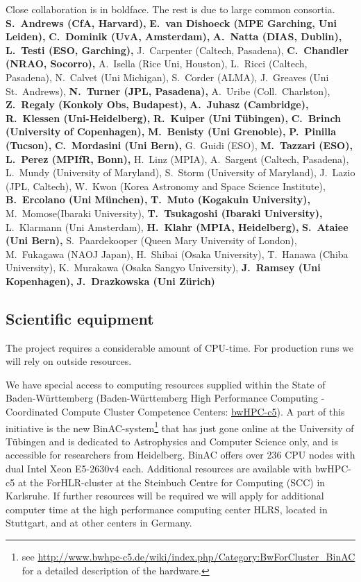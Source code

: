 \documentclass[10pt,fleqn,twoside]{article}
\begin{document}
{\small
Close collaboration is in boldface. The rest is due to large common consortia.\\
{\bf S.~Andrews (CfA, Harvard),}
{\bf E.~van Dishoeck (MPE Garching, Uni Leiden),}
{\bf C.~Dominik (UvA, Amsterdam),}
{\bf A.~Natta (DIAS, Dublin),}
{\bf L.~Testi (ESO, Garching),}
J.~Carpenter (Caltech, Pasadena),
{\bf C.~Chandler (NRAO, Socorro),}
A.~Isella (Rice Uni, Houston),
L.~Ricci (Caltech, Pasadena),
N.~Calvet (Uni Michigan),
S.~Corder (ALMA),
J.~Greaves (Uni St.~Andrews),
{\bf N.~Turner (JPL, Pasadena),}
A.~Uribe (Coll.~Charlston),
{\bf Z.~Regaly (Konkoly Obs, Budapest),}
{\bf A.~Juhasz (Cambridge),}
{\bf R.~Klessen (Uni-Heidelberg),}
{\bf R.~Kuiper (Uni T\"ubingen),}
{\bf C.~Brinch (University of Copenhagen),}
{\bf M.~Benisty (Uni Grenoble),}
{\bf P.~Pinilla (Tucson),}
{\bf C.~Mordasini (Uni Bern),}
G.~Guidi (ESO),
{\bf M.~Tazzari (ESO),}
{\bf L.~Perez (MPIfR, Bonn),}
H.~Linz (MPIA),
A.~Sargent (Caltech, Pasadena),
L.~Mundy (University of Maryland),
S.~Storm (University of Maryland),
J.~Lazio (JPL, Caltech),
W.~Kwon (Korea Astronomy and Space Science Institute),
{\bf B.~Ercolano (Uni M\"unchen),}
{\bf T.~Muto (Kogakuin University),}
M.~Momose(Ibaraki University),
{\bf T.~Tsukagoshi (Ibaraki University),}
L.~Klarmann (Uni Amsterdam),
{\bf H.~Klahr (MPIA, Heidelberg),}
{\bf S.~Ataiee (Uni Bern),}
S.~Paardekooper (Queen Mary University of London),
M.~Fukagawa (NAOJ Japan),
H.~Shibai (Osaka University),
T.~Hanawa (Chiba University),
K.~Murakawa (Osaka Sangyo University),
{\bf J.~Ramsey (Uni Kopenhagen),}
{\bf J.~Drazkowska (Uni Z\"urich)}
}

\subsection{Scientific equipment}

The project requires a considerable amount of CPU-time. For production runs
we will rely on outside resources. 

We have special access to computing resources supplied within the State of
Baden-W\"urttemberg (Baden-W\"urttemberg High Performance Computing -
Coordinated Compute Cluster Competence Centers:
\href{https://www.bwhpc-c5.de}{bwHPC-c5}).  A part of this initiative is the
new BinAC-system\footnote{see
  \url{http://www.bwhpc-c5.de/wiki/index.php/Category:BwForCluster\_BinAC}
  for a detailed description of the hardware.}  that has just gone online at
the University of T\"ubingen and is dedicated to Astrophysics and Computer
Science only, and is accessible for researchers from Heidelberg.  BinAC
offers over 236 CPU nodes with dual Intel Xeon E5-2630v4 each. Additional
resources are available with bwHPC-c5 at the ForHLR-cluster at the Steinbuch
Centre for Computing (SCC) in Karlsruhe.  If further resources will be
required we will apply for additional computer time at the high performance
computing center HLRS, located in Stuttgart, and at other centers in
Germany.
\end{document}
